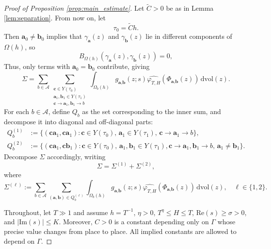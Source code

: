 \documentclass[10pt,a4paper]{amsart}
\newcommand{\Aa}{\textbf{a}}
\newcommand{\Bb}{\textbf{b}}
\newcommand{\Cc}{\textbf{c}}
\begin{document}
\begin{proof}[Proof of Proposition \ref{prop:main_estimate}]
Let $\widetilde{C} > 0$ be as in Lemma \ref{lem:separation}. From now on, let
$$
\tau_0 = \widetilde{C} h.
$$
Then $\Aa_0 \neq \Bb_0$ implies that $\gamma_\Aa(z)$ and $\gamma_\Bb(z)$ lie in different components of $\Omega(h)$, so
$$
B_{\Omega(h)}(\gamma_\Aa(z), \gamma_\Bb(z)) = 0,
$$
Thus, only terms with $\Aa_0 = \Bb_0$ contribute, giving
\begin{equation}\label{eq:reexpr}
\Sigma =   \sum_{b \in \mathcal{A}} 
\sum_{\substack{
\Cc \in Y(\tau_0)\\
\Aa_1,\Bb_1 \in Y(\tau_1)\\
\Cc \to \Aa_1,\Bb_1 \to b
}}
\int_{\Omega_b(h)} g_{\Aa,\Bb}(z;s) \widehat{\varphi_{T,H}}(\Phi_{\Aa,\Bb}(z)) \,\mathrm{dvol}(z).
\end{equation}
For each $b\in \mathcal{A}$, define $Q_b$ as the set corresponding to the inner sum, and decompose it into diagonal and off-diagonal parts:
\begin{align*}
Q_b^{(1)} &:= \{ (\Cc\Aa_1,\Cc\Aa_1) : \Cc \in Y(\tau_0),\, 
\Aa_1\in Y(\tau_1),\, \Cc \to \Aa_1 \to b   \}, \\
Q_b^{(2)} &:= \{ (\Cc\Aa_1,\Cc\Bb_1) : \Cc \in Y(\tau_0),\, 
\Aa_1, \Bb_1\in Y(\tau_1), \Cc \to \Aa_1, \Bb_1 \to b ,\, \Aa_1 \neq \Bb_1 \}.
\end{align*}
Decompose $\Sigma$ accordingly, writing
$$
\Sigma = \Sigma^{(1)} + \Sigma^{(2)},
$$
where
$$
\Sigma^{(\ell)} := \sum_{b \in \mathcal{A}} 
\sum_{(\Aa,\Bb) \in Q_b^{(\ell)}}
\int_{\Omega_b(h)} g_{\Aa,\Bb}(z;s) \widehat{\varphi_{T,H}}(\Phi_{\Aa,\Bb}(z)) \,\mathrm{dvol}(z), \quad \ell\in \{1,2\}.
$$

Throughout, let $T\gg 1$ and assume $h=T^{-1}$, $\eta > 0$, $T^{\eta}\le H \le  T$, $\mathrm{Re}(s)\ge \sigma>0$, and $\vert \mathrm{Im}(s) \vert\le  K$. Moreover, $C>0$ is a constant depending only on $\Gamma$ whose precise value changes from place to place. All implied constants are allowed to depend on $\Gamma.$


\end{proof}
\end{document}
